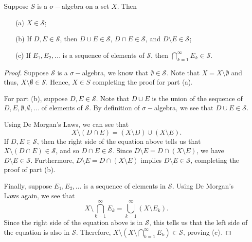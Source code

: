 \documentclass[11pt,a4paper]{book}
\begin{document}
\begin{prop}
   Suppose \( S  \) is a \( \sigma- \)algebra on a set \( X  \). Then 
   \begin{enumerate}
       \item[(a)] \( X \in \mathcal{S} \);
        \item[(b)] If \( D,E \in \mathcal{S} \), then \( D \cup E \in \mathcal{S }  \), \( D \cap E \in \mathcal{S} \), and \( D \setminus  E \in \mathcal{S} \);
        \item[(c)] If \( {E}_{1}, {E}_{2}, \dots   \) is a sequence of elements of \( \mathcal{S} \), then \( \bigcap_{ k=1  }^{ \infty  } {E}_{k } \in \mathcal{S}  \).
   \end{enumerate}
\end{prop}
\begin{proof}
Suppose \( \mathcal{S} \) is a \( \sigma- \)algebra, we know that \( \emptyset \in \mathcal{S } \). Note that \( X = X \setminus \emptyset  \) and thus, \( X \setminus \emptyset \in \mathcal{ S} \). Hence, \( X \in S  \) completing the proof for part (a).

For part (b), suppose \( D,E \in \mathcal{S} \). Note that \( D \cup E  \) is the union of the sequence of \( D,E , \emptyset , \emptyset, \dots  \) of elements of \( \mathcal{S} \). By definition of \( \sigma- \)algebra, we see that \( D \cup E \in \mathcal{S} \).

Using De Morgan's Laws, we can see that
\[  X \setminus (D \cap E) = (X \setminus  D ) \cup (X \setminus  E ).  \]
If \( D,E \in \mathcal{S} \), then the right side of the equation above tells us that \( X \setminus  (D \cap E ) \in \mathcal{S} \), and so \( D \cap E \in \mathcal{S} \). Since \( D \setminus  E = D \cap (X \setminus  E )  \), we have \( D \setminus  E \in \mathcal{S} \). Furthermore, \( D \setminus  E = D \cap (X \setminus  E ) \) implies \( D \setminus  E \in \mathcal{S} \), completing the proof of part (b).

Finally, suppose \( {E}_{1}, {E}_{2}, \dots  \) is a sequence of elements in \( \mathcal{S}. \) Using De Morgan's Laws again, we see that  
\[  X \setminus  \bigcap_{ k=1  }^{ \infty  } {E}_{k } = \bigcup_{ k=1  }^{ \infty  } (X \setminus  {E}_{k }).  \]
Since the right side of the equation above is in \( \mathcal{S} \), this tells us that the left side of the equation is also in \( \mathcal{S} \). Therefore, \( X \setminus  (X \setminus  \bigcap_{ k=1  }^{ \infty  } {E}_{k }) \in \mathcal{S} \), proving (c).
\end{proof}
\end{document}
